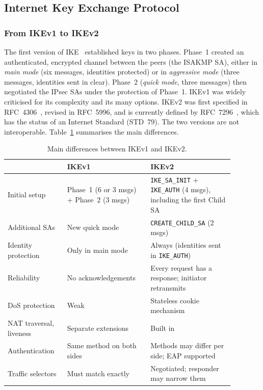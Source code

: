 \subsection{Internet Key Exchange Protocol}
\label{sec:sota-ike}

\subsubsection{From IKEv1 to IKEv2}

The first version of IKE~\cite{rfc2409} established keys in two phases.
Phase~1 created an authenticated, encrypted channel between the peers (the
ISAKMP SA), either in \emph{main mode} (six messages, identities protected) or
in \emph{aggressive mode} (three messages, identities sent in clear). Phase~2
(\emph{quick mode}, three messages) then negotiated the IPsec SAs under the
protection of Phase~1. IKEv1 was widely criticised for its complexity and its
many options. IKEv2 was first specified in RFC~4306~\cite{rfc4306},
revised in RFC~5996, and is currently defined by RFC~7296~\cite{rfc7296}, which
has the status of an Internet Standard (STD~79). The two versions are not
interoperable. Table~\ref{tab:ikev1-v2} summarises the main differences.

\begin{table}[!h] \centering
    \caption{Main differences between IKEv1 and IKEv2.}
    \label{tab:ikev1-v2}
    \begin{tabular}{| p{0.22\linewidth} | p{0.33\linewidth} | p{0.33\linewidth} |} \hline
        & IKEv1 & IKEv2 \\ \hline\hline
        Initial setup & Phase~1 (6 or 3 msgs) + Phase~2 (3 msgs)
            & \texttt{IKE\_SA\_INIT} + \texttt{IKE\_AUTH} (4 msgs), including the first Child SA \\ \hline
        Additional SAs & New quick mode & \texttt{CREATE\_CHILD\_SA} (2 msgs) \\ \hline
        Identity protection & Only in main mode & Always (identities sent in \texttt{IKE\_AUTH}) \\ \hline
        Reliability & No acknowledgements & Every request has a response; initiator retransmits \\ \hline
        DoS protection & Weak & Stateless cookie mechanism \\ \hline
        NAT traversal, liveness & Separate extensions & Built in \\ \hline
        Authentication & Same method on both sides & Methods may differ per side; EAP supported \\ \hline
        Traffic selectors & Must match exactly & Negotiated; responder may narrow them \\ \hline
    \end{tabular}
\end{table}

